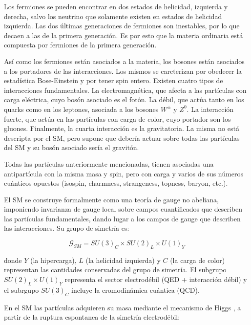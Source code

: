 Los fermiones se pueden encontrar en dos estados de helicidad, izquierda y derecha, salvo los neutrino que solamente existen en estados de helicidad izquierda. Las dos últimas generaciones de fermiones son inestables, por lo que decaen a las de la primera generación. Es por esto que la materia ordinaria está compuesta por fermiones de la primera generación.

Así como los fermiones están asociados a la materia, los bosones están asociados a los portadores de las interacciones. Los mismos se carcterizan por obedecer la estadística Bose-Einstein y por tener spin entero. Existen cuatro tipos de interacciones fundamentales. La electromagnética, que afecta a las partículas con carga eléctrica, cuyo bosón asociado es el fotón. La débil, que actúa tanto en los quarks como en los leptones, asociada a los bosones $W^{\pm}$ y $Z^{0}$. La interacción fuerte, que actúa en las partículas con carga de color, cuyo portador son los gluones. Finalmente, la cuarta interacción es la gravitatoria. La misma no está descripta por el SM, pero supone que debería actuar sobre todas las partículas del SM y su bosón asociado sería el gravitón.

Todas las partículas anteriormente mencionadas, tienen asociadas una antipartícula con la misma masa y spin, pero con carga y varios de sus números cuánticos opuestos (isospin, charmness, strangeness, topness, baryon, etc.). 

El SM se construye formalmente como una teoría de gauge no abeliana, imponiendo invarianza de gauge local sobre campos cuantificados que describen las partículas fundamentales, dando lugar a los campos de gauge que describen las interacciones. Su grupo de simetría es:

\begin{equation}
\mathcal{G}_{SM}=SU(3)_{C}\times SU(2)_{L}\times U(1)_{Y}
\end{equation}


donde $Y$ (la hipercarga), $L$ (la helicidad izquierda) y $C$ (la carga de color) representan las cantidades conservadas del grupo de simetría. El subgrupo $SU(2)_{L}\times U(1)_{Y}$ representa el sector electrodébil (QED + interacción débil) y el subrgupo $SU(3)_{C}$ incluye la cromodinámica cuántica (QCD).


En el SM las partículas adquieren su masa mediante el mecanismo de Higgs \cite{PhysRevLett.13.508}, a partir de la ruptura espontanea de la simetría electrodébil:

